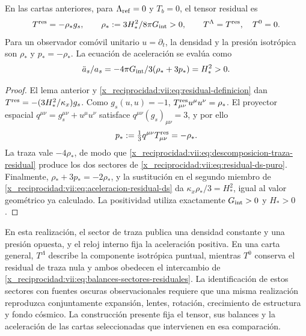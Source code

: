 \begin{theorem}
\label{x_reciprocidad:vii:thm:residual-ds-aceleracion}
En las cartas anteriores, para \(\Lambda_{\rm ref}=0\) y \(T_b=0\),
el tensor residual es
\begin{equation}
 T^{\rm res}=-\rho_*g_s,\qquad
 \rho_*:=\frac{3H_*^2}{8\pi G_{\rm int}}>0,
 \qquad T^\Lambda=T^{\rm res},\quad T^0=0.
 \label{x_reciprocidad:vii:eq:residual-ds-puro}
\end{equation}
Para un observador comóvil unitario \(u=\partial_t\), la densidad
y la presión isotrópica son \(\rho_*\) y \(p_*=-\rho_*\).
La ecuación de aceleración se evalúa como
\begin{equation}
 \frac{\ddot a_s}{a_s}
 =-\frac{4\pi G_{\rm int}}3(\rho_*+3p_*)=H_*^2>0.
 \label{x_reciprocidad:vii:eq:aceleracion-residual-ds}
\end{equation}
\end{theorem}
\begin{proof}
El lema anterior y \eqref{x_reciprocidad:vii:eq:residual-definicion} dan
\(T^{\rm res}=-(3H_*^2/\kappa_x)g_s\).
Como \(g_s(u,u)=-1\),
\(T^{\rm res}_{\mu\nu}u^\mu u^\nu=\rho_*\).
El proyector espacial \(q^{\mu\nu}=g_s^{\mu\nu}+u^\mu u^\nu\)
satisface \(q^{\mu\nu}(g_s)_{\mu\nu}=3\), y por ello
\[
 p_*:=\tfrac13q^{\mu\nu}T^{\rm res}_{\mu\nu}=-\rho_*.
\]
La traza vale \(-4\rho_*\), de modo que
\eqref{x_reciprocidad:vii:eq:descomposicion-traza-residual} produce los dos sectores
de \eqref{x_reciprocidad:vii:eq:residual-ds-puro}. Finalmente,
\(\rho_*+3p_*=-2\rho_*\), y la sustitución en el segundo miembro
de \eqref{x_reciprocidad:vii:eq:aceleracion-residual-ds} da
\(\kappa_x\rho_*/3=H_*^2\), igual al valor geométrico ya calculado.
La positividad utiliza exactamente \(G_{\rm int}>0\) y \(H_*>0\).
\end{proof}

En esta realización, el sector de traza publica una densidad constante
y una presión opuesta, y el reloj interno fija la aceleración positiva.
En una carta general, \(T^\Lambda\) describe la componente isotrópica
puntual, mientras \(T^0\) conserva el residual de traza nula y ambos
obedecen el intercambio de \eqref{x_reciprocidad:vii:eq:balances-sectores-residuales}.
La identificación de estos sectores con fuentes oscuras observacionales
requiere que una misma realización reproduzca conjuntamente expansión,
lentes, rotación, crecimiento de estructura y fondo cósmico. La
construcción presente fija el tensor, sus balances y la aceleración de
las cartas seleccionadas que intervienen en esa comparación.

